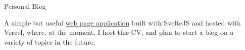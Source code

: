 \cventry
    {Personal Blog}%
    {} %
    {} %
    {} %
    {\begin{cvitems}
        \item{A simple but useful \href{https://gherasim.co.uk}{web page application} built with SvelteJS and hosted with Vercel, where, at the moment,
        I host this CV, and plan to start a blog on a variety of topics in the future.}
    \end{cvitems}}